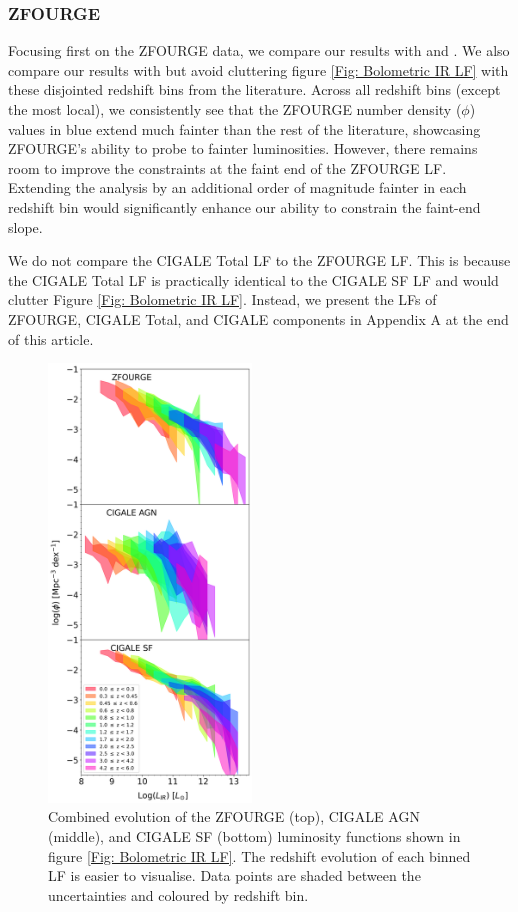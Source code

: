 \subsubsection{ZFOURGE} \label{Sec: ZF Total Discussion}
Focusing first on the ZFOURGE data, we compare our results with \cite{rodighiero_mid-_2010} and \cite{gruppioni_herschel_2013}. We also compare our results with \cite{huang_local_2007, caputi_infrared_2007, fu_decomposing_2010} but avoid cluttering figure \ref{Fig: Bolometric IR LF} with these disjointed redshift bins from the literature. Across all redshift bins (except the most local), we consistently see that the ZFOURGE number density ($\phi$) values in blue extend much fainter than the rest of the literature, showcasing ZFOURGE's ability to probe to fainter luminosities. However, there remains room to improve the constraints at the faint end of the ZFOURGE LF. Extending the analysis by an additional order of magnitude fainter in each redshift bin would significantly enhance our ability to constrain the faint-end slope.

We do not compare the CIGALE Total LF to the ZFOURGE LF. This is because the CIGALE Total LF is practically identical to the CIGALE SF LF and would clutter Figure \ref{Fig: Bolometric IR LF}. Instead, we present the LFs of ZFOURGE, CIGALE Total, and CIGALE components in Appendix A at the end of this article.

\begin{figure}
    \centering
    \includegraphics[width=0.48\textwidth]{Figures/LF_Filled.png}
    \caption{Combined evolution of the ZFOURGE (top), CIGALE AGN (middle), and CIGALE SF (bottom) luminosity functions shown in figure \ref{Fig: Bolometric IR LF}. The redshift evolution of each binned LF is easier to visualise. Data points are shaded between the uncertainties and coloured by redshift bin.}
    \label{Fig: LF Filled}
\end{figure}

